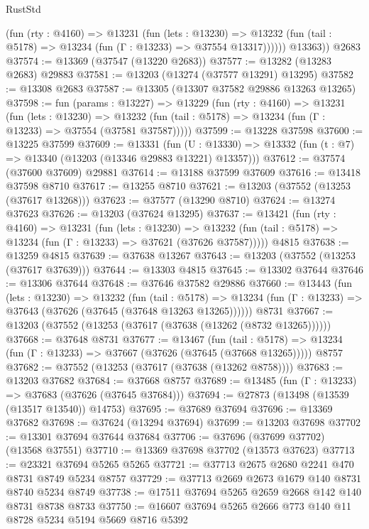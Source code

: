 \begin{lexlean}{RustStd}
\begin{coremodule}
            (fun (rty : @4160) =>
            @13231
              (fun (lets : @13230) =>
              @13232 (fun (tail : @5178) => @13234 (fun (Γ : @13233) => @37554 @13317))))))
        @13363))
    @2683
@37574 := @13369 (@37547 (@13220 @2683))
@37577 := @13282 (@13283 @2683) @29883
@37581 := @13203 (@13274 (@37577 @13291) @13295)
@37582 := @13308 @2683
@37587 := @13305 (@13307 @37582 @29886 @13263 @13265)
@37598 := fun (params : @13227) =>
  @13229
    (fun (rty : @4160) =>
    @13231
      (fun (lets : @13230) =>
      @13232 (fun (tail : @5178) => @13234 (fun (Γ : @13233) => @37554 (@37581 @37587)))))
@37599 := @13228 @37598
@37600 := @13225 @37599
@37609 := @13331
    (fun (U : @13330) => @13332 (fun (t : @7) => @13340 (@13203 (@13346 @29883 @13221) @13357)))
@37612 := @37574 (@37600 @37609) @29881
@37614 := @13188 @37599 @37609
@37616 := @13418 @37598 @8710
@37617 := @13255 @8710
@37621 := @13203 (@37552 (@13253 (@37617 @13268)))
@37623 := @37577 (@13290 @8710)
@37624 := @13274 @37623
@37626 := @13203 (@37624 @13295)
@37637 := @13421
    (fun (rty : @4160) =>
    @13231
      (fun (lets : @13230) =>
      @13232 (fun (tail : @5178) => @13234 (fun (Γ : @13233) => @37621 (@37626 @37587)))))
    @4815
@37638 := @13259 @4815
@37639 := @37638 @13267
@37643 := @13203 (@37552 (@13253 (@37617 @37639)))
@37644 := @13303 @4815
@37645 := @13302 @37644
@37646 := @13306 @37644
@37648 := @37646 @37582 @29886
@37660 := @13443
    (fun (lets : @13230) =>
    @13232
      (fun (tail : @5178) =>
      @13234 (fun (Γ : @13233) => @37643 (@37626 (@37645 (@37648 @13263 @13265))))))
    @8731
@37667 := @13203 (@37552 (@13253 (@37617 (@37638 (@13262 (@8732 @13265))))))
@37668 := @37648 @8731
@37677 := @13467
    (fun (tail : @5178) => @13234 (fun (Γ : @13233) => @37667 (@37626 (@37645 (@37668 @13265)))))
    @8757
@37682 := @37552 (@13253 (@37617 (@37638 (@13262 @8758))))
@37683 := @13203 @37682
@37684 := @37668 @8757
@37689 := @13485 (fun (Γ : @13233) => @37683 (@37626 (@37645 @37684)))
@37694 := @27873 (@13498 (@13539 (@13517 @13540)) @14753)
@37695 := @37689 @37694
@37696 := @13369 @37682
@37698 := @37624 (@13294 @37694)
@37699 := @13203 @37698
@37702 := @13301 @37694 @37644 @37684
@37706 := @37696 (@37699 @37702) (@13568 @37551)
@37710 := @13369 @37698 @37702 (@13573 @37623)
@37713 := @23321 @37694 @5265 @5265
@37721 := @37713 @2675 @2680 @2241 @470 @8731 @8749 @5234 @8757
@37729 := @37713 @2669 @2673 @1679 @140 @8731 @8740 @5234 @8749
@37738 := @17511 @37694 @5265 @2659 @2668 @142 @140 @8731 @8738 @8733
@37750 := @16607 @37694 @5265 @2666 @773 @140 @11 @8728 @5234 @5194 @5669 @8716 @5392

\end{coremodule}
\end{lexlean}
